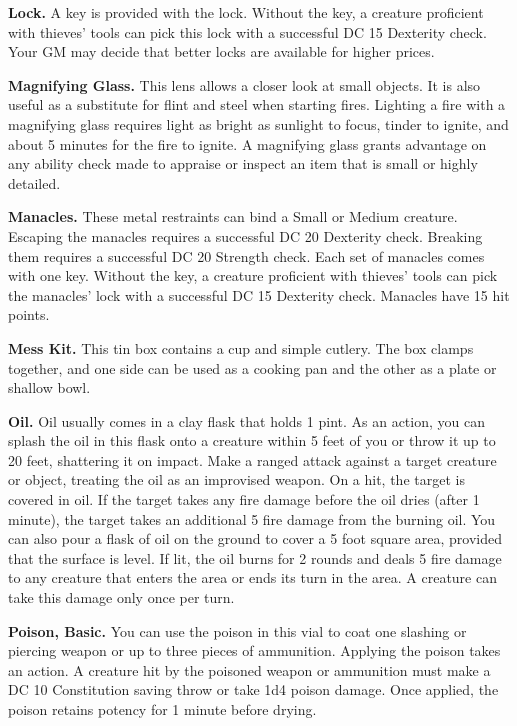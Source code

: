 \documentclass[
]{article}
\begin{document}
\textbf{Lock.} A key is provided with the lock. Without the key, a
creature proficient with thieves' tools can pick this lock with a
successful DC 15 Dexterity check. Your GM may decide that better locks
are available for higher prices.

\textbf{Magnifying Glass.} This lens allows a closer look at small
objects. It is also useful as a substitute for flint and steel when
starting fires. Lighting a fire with a magnifying glass requires light
as bright as sunlight to focus, tinder to ignite, and about 5 minutes
for the fire to ignite. A magnifying glass grants advantage on any
ability check made to appraise or inspect an item that is small or
highly detailed.

\textbf{Manacles.} These metal restraints can bind a Small or Medium
creature. Escaping the manacles requires a successful DC 20 Dexterity
check. Breaking them requires a successful DC 20 Strength check. Each
set of manacles comes with one key. Without the key, a creature
proficient with thieves' tools can pick the manacles' lock with a
successful DC 15 Dexterity check. Manacles have 15 hit points.

\textbf{Mess Kit.} This tin box contains a cup and simple cutlery. The
box clamps together, and one side can be used as a cooking pan and the
other as a plate or shallow bowl.

\textbf{Oil.} Oil usually comes in a clay flask that holds 1 pint. As an
action, you can splash the oil in this flask onto a creature within 5
feet of you or throw it up to 20 feet, shattering it on impact. Make a
ranged attack against a target creature or object, treating the oil as
an improvised weapon. On a hit, the target is covered in oil. If the
target takes any fire damage before the oil dries (after 1 minute), the
target takes an additional 5 fire damage from the burning oil. You can
also pour a flask of oil on the ground to cover a 5 foot square area,
provided that the surface is level. If lit, the oil burns for 2 rounds
and deals 5 fire damage to any creature that enters the area or ends its
turn in the area. A creature can take this damage only once per turn.

\textbf{Poison, Basic.} You can use the poison in this vial to coat one
slashing or piercing weapon or up to three pieces of ammunition.
Applying the poison takes an action. A creature hit by the poisoned
weapon or ammunition must make a DC 10 Constitution saving throw or take
1d4 poison damage. Once applied, the poison retains potency for 1 minute
before drying.
\end{document}
